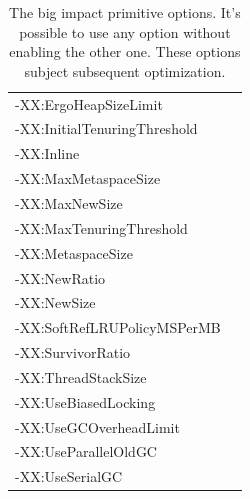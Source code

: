 \documentclass[
  digital, %
  oneside,
  notable, %
  nolof,     %
  nolot     %
]{fithesis3}
\begin{document}
\begin{table}[]
\begin{tabular}{ll}
	\multicolumn{1}{|l|}{-XX:ErgoHeapSizeLimit}                      &                                                             \\ \cline{1-1}
	\multicolumn{1}{|l|}{-XX:InitialTenuringThreshold}               &                                                             \\ \cline{1-1}
	\multicolumn{1}{|l|}{-XX:Inline}                                 &                                                             \\ \cline{1-1}
	\multicolumn{1}{|l|}{-XX:MaxMetaspaceSize}                       &                                                             \\ \cline{1-1}
	\multicolumn{1}{|l|}{-XX:MaxNewSize}                             &                                                             \\ \cline{1-1}
	\multicolumn{1}{|l|}{-XX:MaxTenuringThreshold}                   &                                                             \\ \cline{1-1}
	\multicolumn{1}{|l|}{-XX:MetaspaceSize}                          &                                                             \\ \cline{1-1}
	\multicolumn{1}{|l|}{-XX:NewRatio}                               &                                                             \\ \cline{1-1}
	\multicolumn{1}{|l|}{-XX:NewSize}                                &                                                             \\ \cline{1-1}
	\multicolumn{1}{|l|}{-XX:SoftRefLRUPolicyMSPerMB}                &                                                             \\ \cline{1-1}
	\multicolumn{1}{|l|}{-XX:SurvivorRatio}                          &                                                             \\ \cline{1-1}
	\multicolumn{1}{|l|}{-XX:ThreadStackSize}                        &                                                             \\ \cline{1-1}
	\multicolumn{1}{|l|}{-XX:UseBiasedLocking}                       &                                                             \\ \cline{1-1}
	\multicolumn{1}{|l|}{-XX:UseGCOverheadLimit}                     &                                                             \\ \cline{1-1}
	\multicolumn{1}{|l|}{-XX:UseParallelOldGC}                       &                                                             \\ \cline{1-1}
	\multicolumn{1}{|l|}{-XX:UseSerialGC}                            &                                                             \\ \cline{1-1}
	\end{tabular}
	\caption{The big impact primitive options. It's possible to use any option without enabling the other one. These options subject subsequent optimization.}
	\label{bigimpactprimitive}
\end{table}
	
\end{document}
